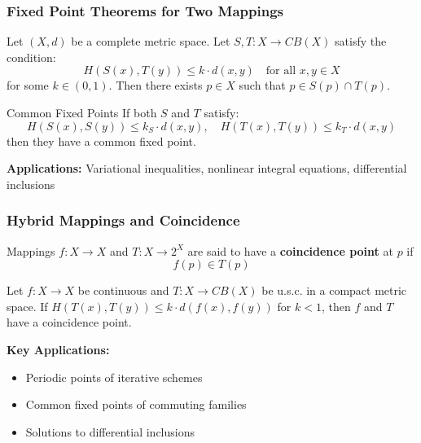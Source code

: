 \documentclass[aspectratio=169,10pt]{beamer}
\begin{document}
\begin{frame}
\frametitle{Fixed Point Theorems for Two Mappings}

\begin{theorem}
Let $(X,d)$ be a complete metric space.
Let $S, T: X \to CB(X)$ satisfy the condition:
\[
H(S(x), T(y)) \leq k \cdot d(x,y) \quad \text{for all } x,y \in X
\]
for some $k \in (0,1)$. Then there exists $p \in X$ such that $p \in S(p) \cap T(p)$.
\end{theorem}

\vspace{0.3cm}

\begin{block}{Common Fixed Points}
If both $S$ and $T$ satisfy:
\[
H(S(x), S(y)) \leq k_S \cdot d(x,y), \quad H(T(x), T(y)) \leq k_T \cdot d(x,y)
\]
then they have a common fixed point.
\end{block}

\vspace{0.3cm}

\textbf{Applications:} Variational inequalities, nonlinear integral equations, differential inclusions

\end{frame}

\begin{frame}
\frametitle{Hybrid Mappings and Coincidence}

\begin{definition}
Mappings $f: X \to X$ and $T: X \to 2^X$ are said to have a \textbf{coincidence point} at $p$ if
\[
f(p) \in T(p)
\]
\end{definition}

\vspace{0.3cm}

\begin{theorem}
Let $f: X \to X$ be continuous and $T: X \to CB(X)$ be u.s.c. in a compact metric space.
If $H(T(x), T(y)) \leq k \cdot d(f(x), f(y))$ for $k < 1$, then $f$ and $T$ have a coincidence point.
\end{theorem}

\vspace{0.3cm}

\textbf{Key Applications:}
\begin{itemize}
    \item Periodic points of iterative schemes
    \item Common fixed points of commuting families
    \item Solutions to differential inclusions
\end{itemize}

\end{frame}
\end{document}
